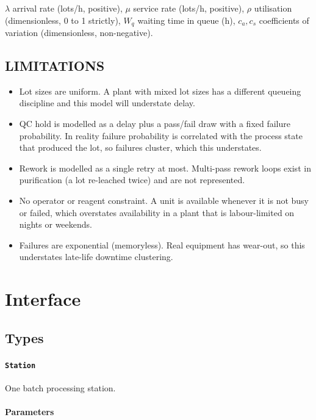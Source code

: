 \documentclass[10pt,a4paper,twoside]{report}
\begin{document}
$\lambda$ arrival rate (lots/h, positive), $\mu$ service rate (lots/h, positive), $\rho$ utilisation (dimensionless, 0 to 1 strictly), $W_q$ waiting time in queue (h), $c_a, c_s$ coefficients of variation (dimensionless, non-negative).

\subsection*{LIMITATIONS}

\begin{itemize}
\item Lot sizes are uniform. A plant with mixed lot sizes has a different queueing discipline and this model will understate delay.
\item QC hold is modelled as a delay plus a pass/fail draw with a fixed failure probability. In reality failure probability is correlated with the process state that produced the lot, so failures cluster, which this understates.
\item Rework is modelled as a single retry at most. Multi-pass rework loops exist in purification (a lot re-leached twice) and are not represented.
\item No operator or reagent constraint. A unit is available whenever it is not busy or failed, which overstates availability in a plant that is labour-limited on nights or weekends.
\item Failures are exponential (memoryless). Real equipment has wear-out, so this understates late-life downtime clustering.
\end{itemize}

\section{Interface}

\subsection*{Types}

\paragraph{\texttt{Station}}

One batch processing station.

\paragraph*{Parameters}
\end{document}
